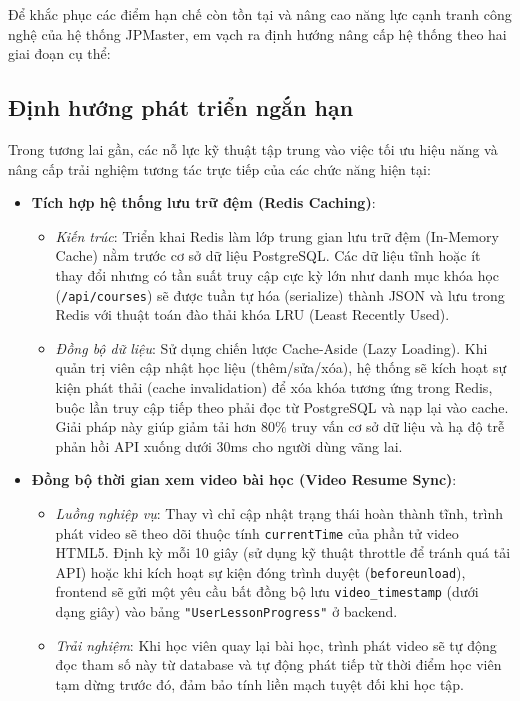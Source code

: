 \documentclass[../DoAn.tex]{subfiles}
\begin{document}
Để khắc phục các điểm hạn chế còn tồn tại và nâng cao năng lực cạnh tranh công nghệ của hệ thống JPMaster, em vạch ra định hướng nâng cấp hệ thống theo hai giai đoạn cụ thể:

\subsection{Định hướng phát triển ngắn hạn}
Trong tương lai gần, các nỗ lực kỹ thuật tập trung vào việc tối ưu hiệu năng và nâng cấp trải nghiệm tương tác trực tiếp của các chức năng hiện tại:
\begin{itemize}
    \item \textbf{Tích hợp hệ thống lưu trữ đệm (Redis Caching)}:
    \begin{itemize}
        \item \textit{Kiến trúc}: Triển khai Redis làm lớp trung gian lưu trữ đệm (In-Memory Cache) nằm trước cơ sở dữ liệu PostgreSQL. Các dữ liệu tĩnh hoặc ít thay đổi nhưng có tần suất truy cập cực kỳ lớn như danh mục khóa học (\texttt{/api/courses}) sẽ được tuần tự hóa (serialize) thành JSON và lưu trong Redis với thuật toán đào thải khóa LRU (Least Recently Used).
        \item \textit{Đồng bộ dữ liệu}: Sử dụng chiến lược Cache-Aside (Lazy Loading). Khi quản trị viên cập nhật học liệu (thêm/sửa/xóa), hệ thống sẽ kích hoạt sự kiện phát thải (cache invalidation) để xóa khóa tương ứng trong Redis, buộc lần truy cập tiếp theo phải đọc từ PostgreSQL và nạp lại vào cache. Giải pháp này giúp giảm tải hơn 80\% truy vấn cơ sở dữ liệu và hạ độ trễ phản hồi API xuống dưới 30ms cho người dùng vãng lai.
    \end{itemize}
    
    \item \textbf{Đồng bộ thời gian xem video bài học (Video Resume Sync)}:
    \begin{itemize}
        \item \textit{Luồng nghiệp vụ}: Thay vì chỉ cập nhật trạng thái hoàn thành tĩnh, trình phát video sẽ theo dõi thuộc tính \texttt{currentTime} của phần tử video HTML5. Định kỳ mỗi 10 giây (sử dụng kỹ thuật throttle để tránh quá tải API) hoặc khi kích hoạt sự kiện đóng trình duyệt (\texttt{beforeunload}), frontend sẽ gửi một yêu cầu bất đồng bộ lưu \texttt{video\_timestamp} (dưới dạng giây) vào bảng \texttt{"UserLessonProgress"} ở backend.
        \item \textit{Trải nghiệm}: Khi học viên quay lại bài học, trình phát video sẽ tự động đọc tham số này từ database và tự động phát tiếp từ thời điểm học viên tạm dừng trước đó, đảm bảo tính liền mạch tuyệt đối khi học tập.
    \end{itemize}
    

\end{itemize}
\end{document}
